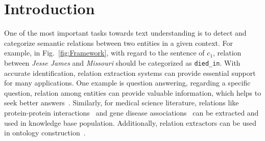 \section{Introduction}
\label{sect:intro}
One of the most important tasks towards text understanding is to detect and categorize semantic relations between two entities in a given context.
For example, in Fig.~\ref{fig:Framework}, with regard to the sentence of $c_1$, relation between \emph{Jesse James} and \emph{Missouri} should be categorized as \texttt{died\_in}. 
With accurate identification, relation extraction systems can provide essential support for many applications.
One example is question answering, regarding a specific question, relation among entities can provide valuable information, which helps to seek better answers~\cite{bao2014knowledge}.
Similarly, for medical science literature, relations like protein-protein interactions~\cite{fundel2007relex} and gene disease associations~\cite{chun2006extraction} can be extracted and used in knowledge base population.
Additionally, relation extractors can be used in ontology construction~\cite{schutz2005relext}.



